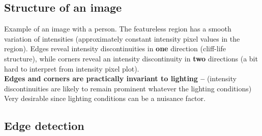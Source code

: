 \documentclass[a4paper,11pt]{article}
\begin{document}
\subsection{Structure of an image}
Example of an image with a person. The featureless region has a smooth variation of intensities (approximately constant intensity pixel values in the region). Edges reveal intensity discontinuities in \textbf{one} direction (cliff-life structure), while corners reveal an intensity discontinuity in \textbf{two} directions (a bit hard to interpret from intensity pixel plot). \\
\textbf{Edges and corners are practically invariant to lighting --} (intensity discontinuities are likely to remain prominent whatever the lighting conditions) Very desirable since lighting conditions can be a nuisance factor.
\subsection{Edge detection}
\end{document}

